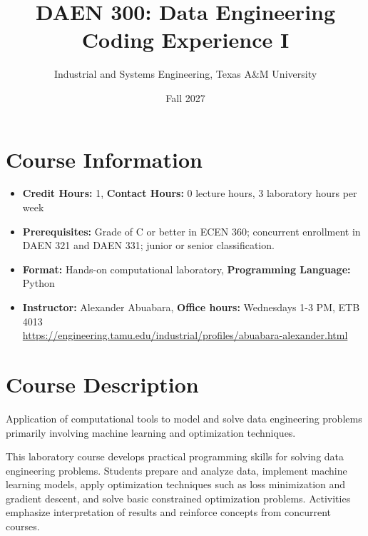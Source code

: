 \documentclass[11pt]{article}
\title{DAEN 300: Data Engineering Coding Experience I}
\author{Industrial and Systems Engineering, Texas A\&M University}
\date{Fall 2027}
\begin{document}
\maketitle

\section*{Course Information}

\begin{itemize}[leftmargin=*,nosep]
    \item \textbf{Credit Hours:} 1, \textbf{Contact Hours:} 0 lecture hours, 3 laboratory hours per week
    \item \textbf{Prerequisites:} Grade of C or better in ECEN 360;
    concurrent enrollment in DAEN 321 and DAEN 331;
    junior or senior classification.
    \item \textbf{Format:} Hands-on computational laboratory, \textbf{Programming Language:} Python
    \item \textbf{Instructor:} Alexander Abuabara, \textbf{Office hours:} Wednesdays 1-3 PM, ETB 4013\\
    \url{https://engineering.tamu.edu/industrial/profiles/abuabara-alexander.html}
\end{itemize}

\section*{Course Description}

Application of computational tools to model and solve data
engineering problems primarily involving machine learning
and optimization techniques.

This laboratory course develops practical programming
skills for solving data engineering problems. Students
prepare and analyze data, implement machine learning models,
apply optimization techniques such as loss minimization
and gradient descent, and solve basic constrained optimization
problems. Activities emphasize interpretation
of results and reinforce concepts from concurrent courses.

\end{document}
